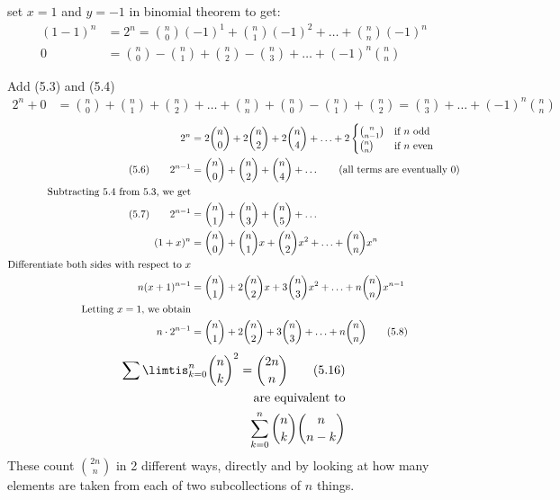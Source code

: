 \documentclass[12pt]{article}
\begin{document}
\vspace{1.5\baselineskip}
set $x=1$ and $y=-1$ in binomial theorem to get:
\begin{align}
    (1-1)^n &= 2^n=\binom{n}{0}(-1)^1 +\binom{n}{1}(-1)^2 + \ldots +\binom{n}{n}(-1)^n \nonumber\\
    0 &= \binom{n}{0} - \binom{n}{1} + \binom{n}{2}-\binom{n}{3} + \ldots + (-1)^n\binom{n}{n} \tag{5.4} 
\end{align}

Add (5.3) and (5.4)
\begin{align}
    2^n+0 &= \binom{n}{0} + \binom{n}{1} +\binom{n}{2} + \ldots +\binom{n}{n} +\binom{n}{0} - \binom{n}{1} + \binom{n}{2} = \binom{n}{3} + \ldots + (-1)^n\binom{n}{n}\nonumber
\end{align}
\begin{align}
    2^n &=2\binom{n}{0} + 2\binom{n}{2} + 2\binom{n}{4} + \ldots + 2\begin{cases}
    \binom{n}{n-1} &\text{if $n$ odd}\nonumber \\
    \binom{n}{n} &\text{if $n$ even}
    \end{cases}\nonumber\\
    (5.6)\qquad 2^{n-1} &= \binom{n}{0}+\binom{n}{2}+\binom{n}{4}+\ldots\tag{\text{all terms are eventually 0}}\\
    \text{Subtracting 5.4 from 5.3, we get}\nonumber \\
    (5.7)\qquad 2^{n-1} &= \binom{n}{1}+\binom{n}{3} + \binom{n}{5} + \ldots \nonumber \\
    (1+x)^n&=\binom{n}{0}+\binom{n}{1}x+\binom{n}{2}x^2 +\ldots + \binom{n}{n}x^n \nonumber \\
    \text{Differentiate both sides with respect to $x$} \nonumber \\
    n(x+1)^{n-1} &= \binom{n}{1}+2\binom{n}{2}x+3\binom{n}{3}x^2 + \ldots + n\binom{n}{n}x^{n-1} \nonumber \\
    \text{Letting $x=1$, we obtain}\nonumber \\
    n\cdot 2^{n-1} &= \binom{n}{1}+2\binom{n}{2}+3\binom{n}{3}+\ldots + n\binom{n}{n} \tag{5.8}
\end{align}
\begin{align}
    \sum\limtis_{k=0}^n \binom{n}{k}^2 = \binom{2n}{n} \tag{5.16}\\
    \text{are equivalent to}\nonumber \\
    \sum\limits_{k=0}^n \binom{n}{k}\binom{n}{n-k} \nonumber
\end{align}
These count $\binom{2n}{n}$ in 2 different ways, directly and by looking at how many elements are taken from each of two subcollections of $n$ things.
\end{document}
